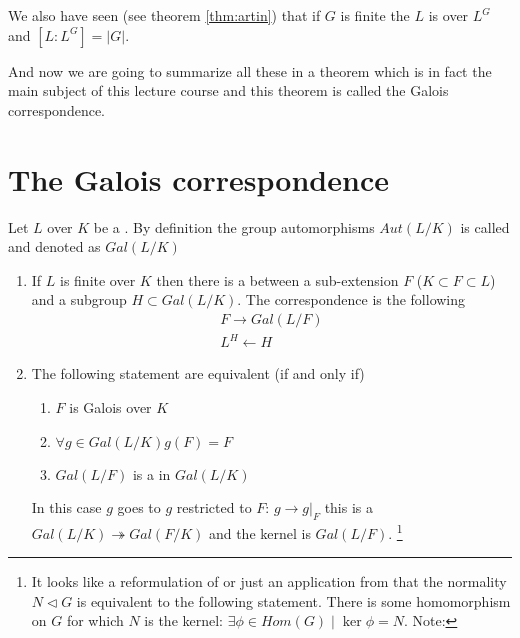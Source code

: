 We also have seen (see theorem \ref{thm:artin}) that if $G$ is finite
the $L$ is  over $L^G$ and
$\left[L:L^G\right] = \left|G\right|$.

And now we are going to summarize all these in a theorem which is in
fact the main subject of this lecture course and this theorem is
called the Galois correspondence. 

\section{The Galois correspondence}

Let $L$ over $K$ be a . By definition the
group automorphisms $Aut\left(L/K\right)$ is called
 and denoted as $Gal\left(L/K\right)$
\begin{theorem}
  \begin{enumerate}
  \item If $L$ is finite over $K$ then there is a
     between a sub-extension $F$
    ($K \subset F \subset L$) and a subgroup $H \subset
    Gal\left(L/K\right)$. The correspondence is the following
    \begin{eqnarray}
      F \rightarrow Gal\left(L/F\right)
      \nonumber \\
      L^H \leftarrow H
      \nonumber
    \end{eqnarray}
  \item The following statement are equivalent (if and only if)
    \begin{enumerate}
    \item $F$ is Galois over $K$
    \item $\forall g \in Gal\left(L/K\right) g\left(F\right) = F$
    \item $Gal\left(L/F\right)$ is a  in
      $Gal\left(L/K\right)$ 
    \end{enumerate}
    In this case  $g$ goes to $g$ restricted to $F$: $g \to
    \left.g\right|_F$ this is a 
    $Gal\left(L/K\right) \twoheadrightarrow Gal\left(F/K\right)$ and
    the kernel is $Gal\left(L/F\right)$.
    \footnote{
      It looks like a reformulation of 
      or just an application from \cite{wiki:normalsubgroup} that the
      normality $N \triangleleft G$ is equivalent to the following
      statement. There is some homomorphism on $G$ for which $N$ is
      the kernel: $\exists \phi \in Hom(G) \mid \ker{\phi} =N$. Note:
}
\end{enumerate}
\end{theorem}
